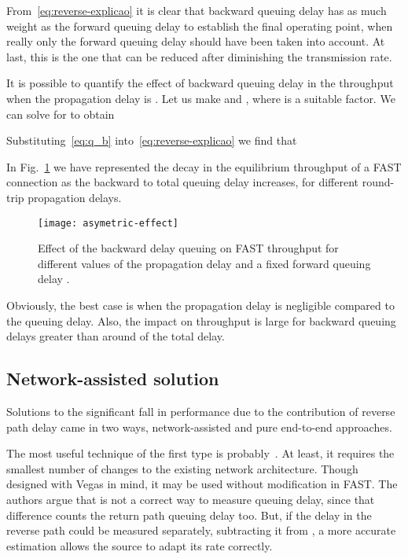 \documentclass[english,times]{ettauth}
\begin{document}
From~\eqref{eq:reverse-explicao} it is clear that backward queuing delay has
as much weight as the forward queuing delay to establish the final operating
point, when really only the forward queuing delay should have been taken into
account. At last, this is the one that can be reduced after diminishing the
transmission rate.

It is possible to quantify the effect of backward queuing delay in the
throughput when the propagation delay is . Let us make  and , where  is
a suitable factor. We can solve for  to obtain

Substituting~\eqref{eq:q_b} into~\eqref{eq:reverse-explicao} we find that


In Fig.~\ref{fig:asymetric-effect} we have represented the decay in the
equilibrium throughput of a FAST connection as the backward to total queuing
delay increases, for different round-trip propagation delays.
\begin{figure}
  \centering
  \texttt{[image: asymetric-effect]}
  \caption{Effect of the backward delay queuing  on FAST
    throughput for different values of the propagation delay  and a fixed
    forward queuing delay .}
  \label{fig:asymetric-effect}
\end{figure}
Obviously, the best case is when the propagation delay is negligible compared
to the queuing delay. Also, the impact on throughput is large for backward
queuing delays greater than around  of the total delay.

\subsection{Network-assisted solution}
\label{sec:assist-from-netw}

Solutions to the significant fall in performance due to the contribution of
reverse path delay came in two ways, network-assisted and pure end-to-end
approaches.

The most useful technique of the first type is probably~\cite{Liu05}. At
least, it requires the smallest number of changes to the existing network
architecture. Though designed with Vegas in mind, it may be used without
modification in FAST. The authors argue that  is not a correct
way to measure queuing delay, since that difference counts the return path
queuing delay too. But, if the delay in the reverse path 
could be measured separately, subtracting it from , a more accurate
estimation  allows the source to
adapt its rate correctly.
\end{document}
